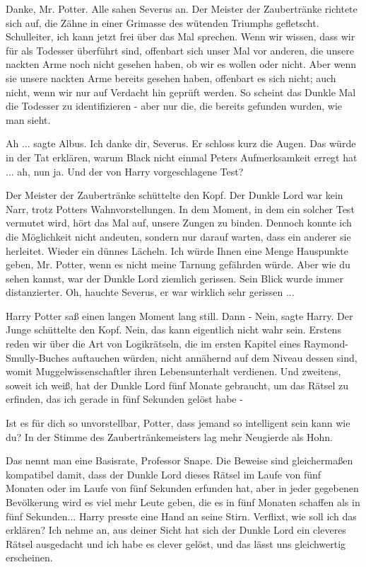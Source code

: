 \glqq Danke, Mr. Potter.\grqq{} Alle sahen Severus an. Der Meister der
Zaubertränke richtete sich auf, die Zähne in einer Grimasse des wütenden
Triumphs gefletscht. \glqq Schulleiter, ich kann jetzt frei über das Mal
sprechen. Wenn wir wissen, dass wir für als Todesser überführt sind, offenbart
sich unser Mal vor anderen, die unsere nackten Arme noch nicht gesehen haben, ob
wir es wollen oder nicht. Aber wenn sie unsere nackten Arme bereits gesehen
haben, offenbart es sich nicht; auch nicht, wenn wir nur auf Verdacht hin
geprüft werden. So scheint das Dunkle Mal die Todesser zu identifizieren - aber
nur die, die bereits gefunden wurden, wie man sieht.\grqq{}

\glqq Ah ...\grqq{} sagte Albus. \glqq Ich danke dir, Severus.\grqq{} Er schloss
kurz die Augen. \glqq Das würde in der Tat erklären, warum Black nicht einmal
Peters Aufmerksamkeit erregt hat ... ah, nun ja. Und der von Harry
vorgeschlagene Test?\grqq{}

Der Meister der Zaubertränke schüttelte den Kopf. \glqq Der Dunkle Lord war kein
Narr, trotz Potters Wahnvorstellungen. In dem Moment, in dem ein solcher Test
vermutet wird, hört das Mal auf, unsere Zungen zu binden. Dennoch konnte ich die
Möglichkeit nicht andeuten, sondern nur darauf warten, dass ein anderer sie
herleitet.\grqq{} Wieder ein dünnes Lächeln. \glqq Ich würde Ihnen eine Menge
Hauspunkte geben, Mr. Potter, wenn es nicht meine Tarnung gefährden würde. Aber
wie du sehen kannst, war der Dunkle Lord ziemlich gerissen.\grqq{} Sein Blick
wurde immer distanzierter. \glqq Oh\grqq{}, hauchte Severus, \glqq er war
wirklich sehr gerissen ...\grqq{}

Harry Potter saß einen langen Moment lang still. Dann - \glqq Nein\grqq{}, sagte
Harry. Der Junge schüttelte den Kopf. \glqq Nein, das kann eigentlich nicht wahr
sein. Erstens reden wir über die Art von Logikrätseln, die im ersten Kapitel
eines Raymond-Smully-Buches auftauchen würden, nicht annähernd auf dem Niveau
dessen sind, womit Muggelwissenschaftler ihren Lebensunterhalt verdienen. Und
zweitens, soweit ich weiß, hat der Dunkle Lord fünf Monate gebraucht, um das
Rätsel zu erfinden, das ich gerade in fünf Sekunden gelöst habe -\grqq{}

\glqq Ist es für dich so unvorstellbar, Potter, dass jemand so intelligent sein
kann wie du?\grqq{} In der Stimme des Zaubertränkemeisters lag mehr Neugierde
als Hohn.

\glqq Das nennt man eine Basisrate, Professor Snape. Die Beweise sind
gleichermaßen kompatibel damit, dass der Dunkle Lord dieses Rätsel im Laufe von
fünf Monaten oder im Laufe von fünf Sekunden erfunden hat, aber in jeder
gegebenen Bevölkerung wird es viel mehr Leute geben, die es in fünf Monaten
schaffen als in fünf Sekunden...\grqq{} Harry presste eine Hand an seine Stirn.
\glqq Verflixt, wie soll ich das erklären? Ich nehme an, aus deiner Sicht hat
sich der Dunkle Lord ein cleveres Rätsel ausgedacht und ich habe es clever
gelöst, und das lässt uns gleichwertig erscheinen.\grqq{}

